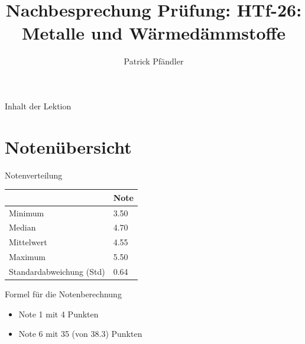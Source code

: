 
\usepackage{fontawesome}  %


\title{\textbf{Nachbesprechung Prüfung: HTf-26: Metalle und Wärmedämmstoffe}}
\author{Patrick Pfändler}






\frame{\titlepage}

\begin{frame}{Inhalt der Lektion}
    \tableofcontents
\end{frame}


\section{Notenübersicht}
\begin{frame}{Notenverteilung}
    \begin{table}[h!]
        \centering
        \label{tab:statistische_werte}
        \begin{tabular}{ll}
            \hline
            \textbf{{}} & \textbf{Note} \\ \hline
            Minimum & 3.50 \\
            Median & 4.70 \\
            Mittelwert & 4.55 \\
            Maximum & 5.50 \\
            Standardabweichung (Std) & 0.64 \\ \hline
        \end{tabular}
    \end{table}
\end{frame}


\begin{frame}{Formel für die Notenberechnung}
    \begin{itemize}
        \item[\textbullet] Note 1 mit 4 Punkten
        \item[\textbullet] Note 6 mit 35 (von 38.3) Punkten  
    \end{itemize}
\end{frame}

